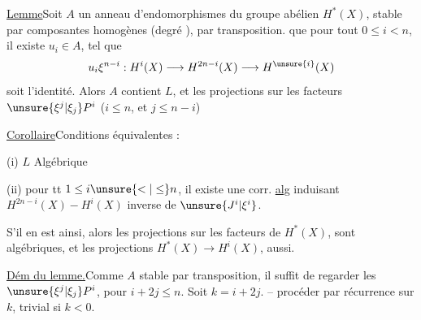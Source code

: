 
\uline{Lemme}\quad Soit $A$ un anneau d'endomorphismes du groupe abélien $H^*(X)$, stable par composantes homogènes (degré ), par transposition.   que pour tout $0\leq i<n$, il existe $u_i\in A$,  tel que
\[
u_i\xi^{n-i}:H^i(X)\longrightarrow H^{2n-i}(X)\longrightarrow H^{\unsure{i}}(X)
\]
soit l'identité.
Alors $A$ contient $L$\unsure{!},  et les projections sur les facteurs  $\unsure{\xi^j|\xi_j}P^i$ ($i\leq n$, et  $j\leq n-i$)

\uline{Corollaire}\quad Conditions équivalentes :

(i) $L$ Algébrique

(ii) pour tt $1\leq i\unsure{<|\leq}n$, il existe une corr. \uline{alg} induisant $H^{2n-i}(X)\mathrel{-}H^i(X)$ inverse de $\unsure{J^i|\xi^i}$.

 S'il en est ainsi, alors les \deleted{$\unsure{\xi}$} projections sur les facteurs  de $H^*(X)$, sont algébriques, et les projections $H^*(X)\to H^i(X)$, aussi.

\uline{Dém du lemme.}\quad Comme $A$ stable par transposition, il suffit de regarder les $\unsure{\xi^j|\xi_j}P^i$, pour $i+2j\leq n$. Soit $k=i+2j$. -- procéder par récurrence sur $k$, trivial si $k<0$.

